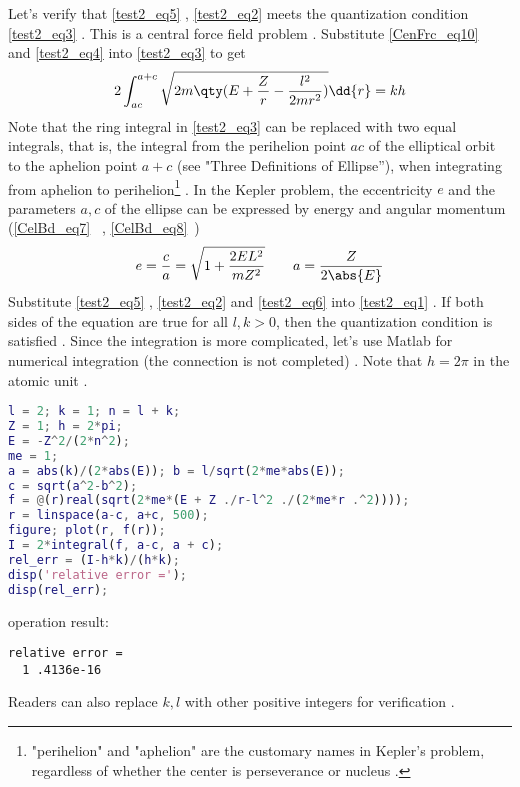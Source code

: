 Let's verify that \autoref{test2_eq5} , \autoref{test2_eq2} meets the quantization condition \autoref{test2_eq3} . This is a central force field problem . Substitute \autoref{CenFrc_eq10}~ and \autoref{test2_eq4} into \autoref{test2_eq3} to get
\begin{equation}\label{test2_eq1}
2\int_{ac}^{a+c} \sqrt{2m\qty(E + \frac{Z}{r}-\frac{l^2}{2mr^2})} \dd{r} = kh
\end{equation}
Note that the ring integral in \autoref{test2_eq3} can be replaced with two equal integrals, that is, the integral from the perihelion point $ac$ of the elliptical orbit to the aphelion point $a+c$ (see "Three Definitions of Ellipse”), when integrating from aphelion to perihelion\footnote{"perihelion" and "aphelion" are the customary names in Kepler's problem, regardless of whether the center is perseverance or nucleus . } . In the Kepler problem, the eccentricity $e$ and the parameters $a, c$ of the ellipse can be expressed by energy and angular momentum (\autoref{CelBd_eq7}~ , \autoref{CelBd_eq8}~)
\begin{equation}\label{test2_eq6}
e = \frac{c}{a} = \sqrt{1 + \frac{2EL^2}{mZ^2}}
\qquad
a = \frac{Z}{2\abs{E}}
\end{equation}
Substitute \autoref{test2_eq5} , \autoref{test2_eq2} and \autoref{test2_eq6} into \autoref{test2_eq1} . If both sides of the equation are true for all $l,k> 0$, then the quantization condition is satisfied . Since the integration is more complicated, let's use Matlab for numerical integration (the connection is not completed) . Note that $h = 2\pi$ in the atomic unit .
\begin{lstlisting}[language=matlab]
l = 2; k = 1; n = l + k;
Z = 1; h = 2*pi;
E = -Z^2/(2*n^2);
me = 1;
a = abs(k)/(2*abs(E)); b = l/sqrt(2*me*abs(E));
c = sqrt(a^2-b^2);
f = @(r)real(sqrt(2*me*(E + Z ./r-l^2 ./(2*me*r .^2))));
r = linspace(a-c, a+c, 500);
figure; plot(r, f(r));
I = 2*integral(f, a-c, a + c);
rel_err = (I-h*k)/(h*k);
disp('relative error =');
disp(rel_err);
\end{lstlisting}
operation result: 
\begin{lstlisting}[language=matlabC]
relative error =
  1 .4136e-16
\end{lstlisting}
Readers can also replace $k, l$ with other positive integers for verification .

